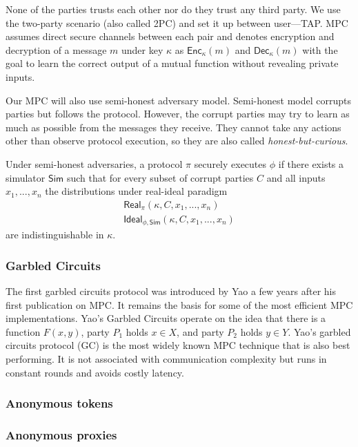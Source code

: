 None of the parties trusts each other nor do they trust any third party. We use
the two-party scenario (also called 2PC) and set it up between user---TAP. MPC
assumes direct secure channels between each pair and denotes encryption and
decryption of a message $m$ under key $\kappa$ as $\mathsf{Enc}_\kappa(m)$ and
$\mathsf{Dec}_\kappa(m)$ with the goal to learn the correct output of a mutual
function without revealing private inputs.

Our MPC will also use semi-honest adversary model. Semi-honest model corrupts
parties but follows the protocol. However, the corrupt parties may try to learn
as much as possible from the messages they receive. They cannot take any actions
other than observe protocol execution, so they are also called
\emph{honest-but-curious}.

Under semi-honest adversaries, a protocol $\pi$ securely executes $\phi$ if
there exists a simulator $\mathsf{Sim}$ such that for every subset of corrupt
parties $C$ and all inputs $x_1, ..., x_n$ the distributions under real-ideal
paradigm
\begin{gather*}
  \mathsf{Real}_{\pi}(\kappa, C, x_1, ..., x_n) \\
  \mathsf{Ideal}_{\phi, \mathsf{Sim}} (\kappa, C, x_1, ..., x_n)
\end{gather*} 
are indistinguishable in $\kappa$.


\subsubsection{Garbled Circuits}

The first garbled circuits protocol was introduced by Yao a few years after his
first publication on MPC. It remains the basis for some of the most efficient
MPC implementations. Yao's Garbled Circuits operate on the idea that there is a
function $F(x,y)$, party $P_1$ holds $x \in X$, and party $P_2$ holds $y \in Y$.
Yao's garbled circuits protocol (GC) is the most widely known MPC technique that
is also best performing. It is not associated with communication complexity but
runs in constant rounds and avoids costly latency.

\subsubsection{Anonymous tokens}

\subsubsection{Anonymous proxies}
